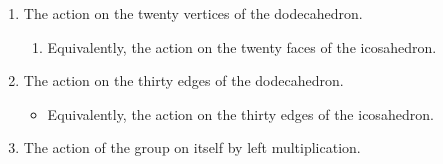 \documentclass[../notes.tex]{subfiles}
\begin{document}
\begin{itemize}
\begin{enumerate}
\begin{enumerate}
        \end{enumerate}
        \item The action on the twenty vertices of the dodecahedron.
        \begin{enumerate}
            \item Equivalently, the action on the twenty faces of the icosahedron.
        \end{enumerate}
        \item The action on the thirty edges of the dodecahedron.
        \begin{itemize}
            \item Equivalently, the action on the thirty edges of the icosahedron.
        \end{itemize}
        \item The action of the group on itself by left multiplication.
    \end{enumerate}
\end{itemize}
\end{document}
